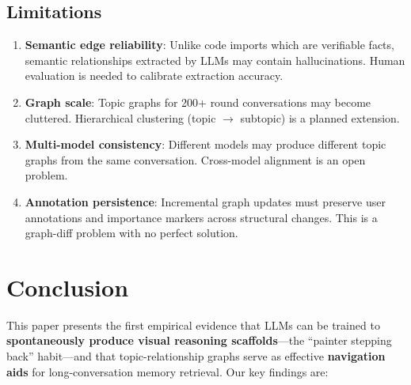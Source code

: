 \documentclass[11pt,a4paper]{article}
\begin{document}
\subsection{Limitations}

\begin{enumerate}[nosep]
\item \textbf{Semantic edge reliability}: Unlike code imports which are verifiable facts, semantic relationships extracted by LLMs may contain hallucinations. Human evaluation is needed to calibrate extraction accuracy.
\item \textbf{Graph scale}: Topic graphs for 200+ round conversations may become cluttered. Hierarchical clustering (topic $\rightarrow$ subtopic) is a planned extension.
\item \textbf{Multi-model consistency}: Different models may produce different topic graphs from the same conversation. Cross-model alignment is an open problem.
\item \textbf{Annotation persistence}: Incremental graph updates must preserve user annotations and importance markers across structural changes. This is a graph-diff problem with no perfect solution.
\end{enumerate}


\section{Conclusion}

This paper presents the first empirical evidence that LLMs can be trained to \textbf{spontaneously produce visual reasoning scaffolds}---the ``painter stepping back'' habit---and that topic-relationship graphs serve as effective \textbf{navigation aids} for long-conversation memory retrieval. Our key findings are:
\end{document}
